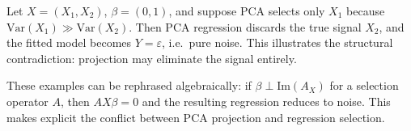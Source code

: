 \begin{example}
Let $X = (X_1,X_2)$, $\beta = (0,1)$, and suppose PCA selects only $X_1$ 
because $\mathrm{Var}(X_1) \gg \mathrm{Var}(X_2)$. 
Then PCA regression discards the true signal $X_2$, and the fitted model becomes $Y=\varepsilon$, 
i.e.\ pure noise. This illustrates the structural contradiction: 
projection may eliminate the signal entirely. 
\end{example}

\begin{remark}
These examples can be rephrased algebraically: 
if $\beta \perp \mathrm{Im}(A_X)$ for a selection operator $A$, 
then $AX\beta = 0$ and the resulting regression reduces to noise. 
This makes explicit the conflict between PCA projection and regression selection. 
\end{remark}
